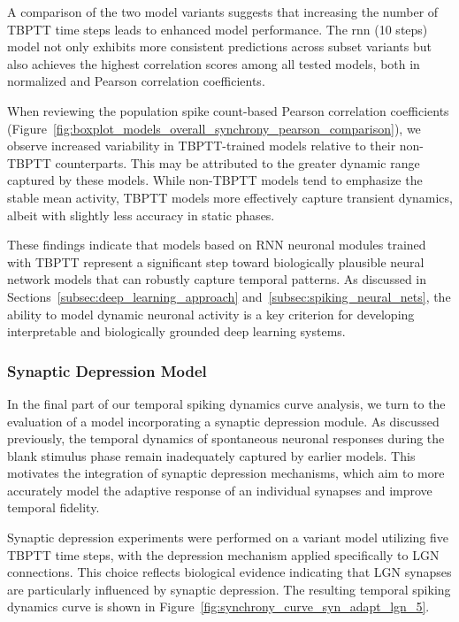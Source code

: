 A comparison of the two model variants suggests that increasing the number of TBPTT time steps leads to enhanced model performance. The rnn (10 steps) model not only exhibits more consistent predictions across subset variants but also achieves the highest correlation scores among all tested models, both in normalized and Pearson correlation coefficients.

When reviewing the population spike count-based Pearson correlation coefficients (Figure~\ref{fig:boxplot_models_overall_synchrony_pearson_comparison}), we observe increased variability in TBPTT-trained models relative to their non-TBPTT counterparts. This may be attributed to the greater dynamic range captured by these models. While non-TBPTT models tend to emphasize the stable mean activity, TBPTT models more effectively capture transient dynamics, albeit with slightly less accuracy in static phases.

These findings indicate that models based on RNN neuronal modules trained with TBPTT represent a significant step toward biologically plausible neural network models that can robustly capture temporal patterns. As discussed in Sections~\ref{subsec:deep_learning_approach} and~\ref{subsec:spiking_neural_nets}, the ability to model dynamic neuronal activity is a key criterion for developing interpretable and biologically grounded deep learning systems.

\subsubsection{Synaptic Depression Model}
\label{{subsubsec:syn_adap_lgn_5}}

In the final part of our temporal spiking dynamics curve analysis, we turn to the evaluation of a model incorporating a synaptic depression module. As discussed previously, the temporal dynamics of spontaneous neuronal responses during the blank stimulus phase remain inadequately captured by earlier models. This motivates the integration of synaptic depression mechanisms, which aim to more accurately model the adaptive response of an individual synapses and improve temporal fidelity.

Synaptic depression experiments were performed on a variant model utilizing five TBPTT time steps, with the depression mechanism applied specifically to LGN connections. This choice reflects biological evidence indicating that LGN synapses are particularly influenced by synaptic depression. The resulting temporal spiking dynamics curve is shown in Figure~\ref{fig:synchrony_curve_syn_adapt_lgn_5}.

